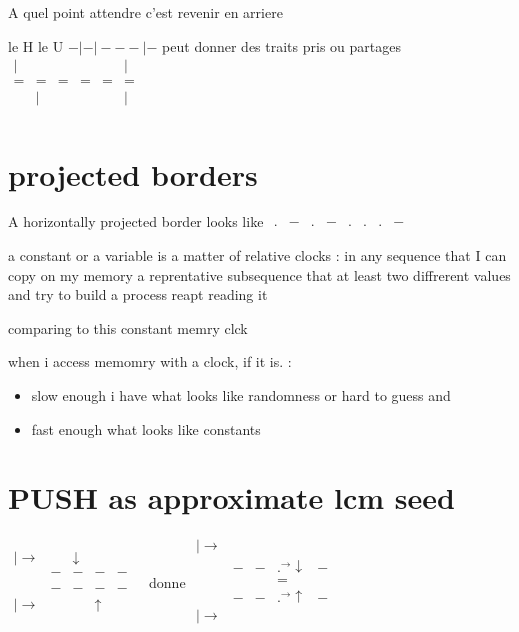\documentclass{article}
\begin{document}

A quel point attendre c'est revenir en arriere

le H le U
 $-|-|---|-$ peut donner  des traits pris ou partages
$\begin{matrix}
|& &&&&|\\
=&=&=&=&=&=\\
&|&&&&|\\
\end{matrix}$



\section{projected borders}
A horizontally projected  border looks like  $\begin{matrix} .  &-& .& -  &.&.&.&-\end{matrix}$

a constant or a variable is a matter of relative clocks : in any sequence that I can copy on my 
memory a reprentative  subsequence that at least two diffrerent values 
and try to build a process reapt reading it 

comparing to this  constant memry clck

when i access memomry with a clock, if it is. :
\begin{itemize}
\item slow enough i have what looks like randomness or hard to guess  and 
\item  fast enough what looks like constants
\end{itemize}


\section{PUSH as approximate lcm seed}
$
\begin{matrix}
| \longrightarrow&&\downarrow&&\\
                  &-&-&-&- \\
                  &&&&\\
                   &-&-&-&- \\
| \rightarrow&&&\uparrow&&\\                
\end{matrix}
$
donne 
$
\begin{matrix}
| \longrightarrow&&&&\\
                  &-&-&.^{\longrightarrow} \downarrow &- \\
                  & & &=& \\
                   &-&-&.^\rightarrow \uparrow            &- \\
| \rightarrow& & &&&\\                
\end{matrix}
$
\end{document}
